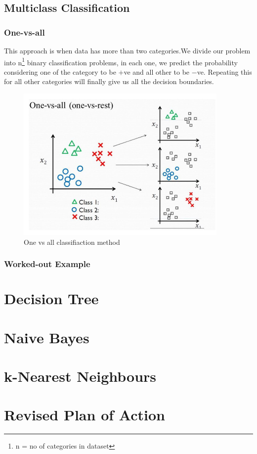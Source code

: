 \documentclass[12pt, A4]{report}
\begin{document}
\section*{Multiclass Classification}
  \subsection*{One-vs-all}
    This approach is when data has more than two categories.We divide our problem into n\footnote[1]{n = no of categories in dataset} binary classification problems, in each one, we predict the probability considering one of the category to be $+$ve and all other to be $-$ve. Repeating this for all other categories will finally give us all the decision boundaries.
    \begin{figure}[h]
      \centering
      \includegraphics[scale = 0.6]{oneall.png}
      \caption{One vs all classifiaction method}
    \end{figure}   

  \subsection*{Worked-out Example}
	


\chapter{Decision Tree}


\chapter{Naive Bayes}



\chapter{k-Nearest Neighbours}


\chapter{Revised Plan of Action}

\end{document}
